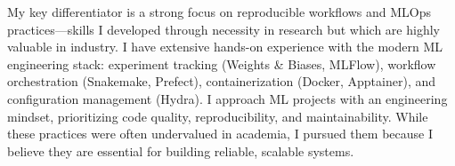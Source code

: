 \documentclass[11pt, a4paper]{awesome-cv}
\begin{document}
\begin{cvletter}
%
My key differentiator is a strong focus on reproducible workflows and MLOps practices—skills I developed through necessity in research but which are highly valuable in industry. I have extensive hands-on experience with the modern ML engineering stack: experiment tracking (Weights \& Biases, MLFlow), workflow orchestration (Snakemake, Prefect), containerization (Docker, Apptainer), and configuration management (Hydra). I approach ML projects with an engineering mindset, prioritizing code quality, reproducibility, and maintainability. While these practices were often undervalued in academia, I pursued them because I believe they are essential for building reliable, scalable systems.
%

%
%

%
%


\end{cvletter}
\end{document}
